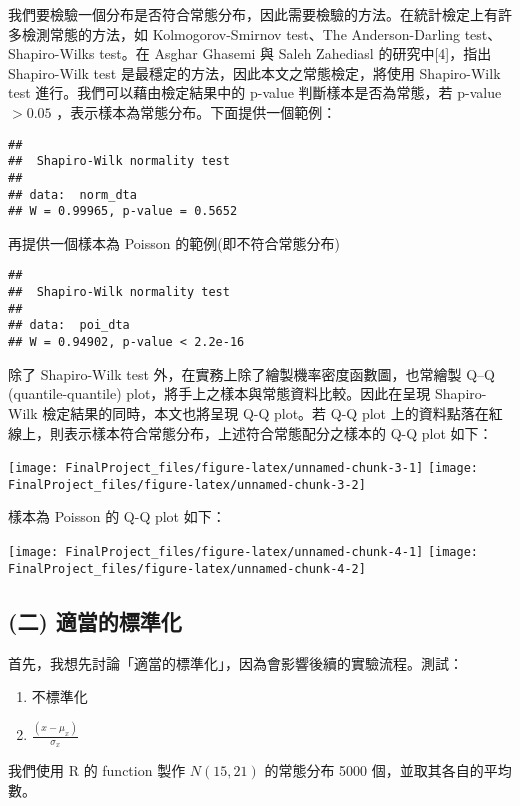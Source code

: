 \documentclass[]{article}
\providecommand{\tightlist}{%
  \setlength{\itemsep}{0pt}\setlength{\parskip}{0pt}}
\begin{document}
我們要檢驗一個分布是否符合常態分布，因此需要檢驗的方法。在統計檢定上有許多檢測常態的方法，如
Kolmogorov-Smirnov test、The Anderson-Darling test、Shapiro-Wilks
test。在 Asghar Ghasemi 與 Saleh Zahediasl 的研究中{[}4{]}，指出
Shapiro-Wilk test 是最穩定的方法，因此本文之常態檢定，將使用
Shapiro-Wilk test 進行。我們可以藉由檢定結果中的 p-value
判斷樣本是否為常態，若 p-value \(> 0.05\)
，表示樣本為常態分布。下面提供一個範例：

\begin{verbatim}
## 
##  Shapiro-Wilk normality test
## 
## data:  norm_dta
## W = 0.99965, p-value = 0.5652
\end{verbatim}

再提供一個樣本為 Poisson 的範例(即不符合常態分布)

\begin{verbatim}
## 
##  Shapiro-Wilk normality test
## 
## data:  poi_dta
## W = 0.94902, p-value < 2.2e-16
\end{verbatim}

除了 Shapiro-Wilk test 外，在實務上除了繪製機率密度函數圖，也常繪製 Q--Q
(quantile-quantile) plot，將手上之樣本與常態資料比較。因此在呈現
Shapiro-Wilk 檢定結果的同時，本文也將呈現 Q-Q plot。若 Q-Q plot
上的資料點落在紅線上，則表示樣本符合常態分布，上述符合常態配分之樣本的
Q-Q plot 如下：

\texttt{[image: FinalProject\_files/figure-latex/unnamed-chunk-3-1]}
\texttt{[image: FinalProject\_files/figure-latex/unnamed-chunk-3-2]}

樣本為 Poisson 的 Q-Q plot 如下：

\texttt{[image: FinalProject\_files/figure-latex/unnamed-chunk-4-1]}
\texttt{[image: FinalProject\_files/figure-latex/unnamed-chunk-4-2]}

\hypertarget{-}{%
\subsection{(二) 適當的標準化}\label{-}}

首先，我想先討論「適當的標準化」，因為會影響後續的實驗流程。測試：

\begin{enumerate}
\def\labelenumi{\arabic{enumi}.}
\tightlist
\item
  不標準化
\item
  \(\frac{(x-\mu_x)}{\sigma_x}\)
\end{enumerate}

我們使用 R 的 function 製作 \(N(15, 21)\) 的常態分布 5000
個，並取其各自的平均數。
\end{document}
